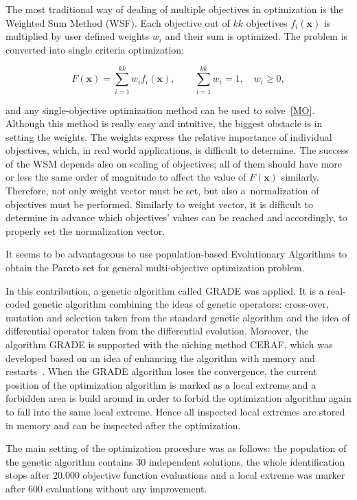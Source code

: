 \documentclass[review]{myarticle}
\newenvironment{lineq}
    {\begin{linenomath*}
    \begin{equation}
    }
    { 
    \end{equation} 
    \end{linenomath*}
    }
\renewcommand{\vec}{\mathbf}
\begin{document}
The most traditional way of dealing of multiple objectives in optimization is the Weighted Sum Method (WSF). Each objective out of $kk$ objectives $f_i(\vec{x})$ is multiplied by user defined weights $w_i$ and their sum is optimized. The problem is converted into single criteria optimization:
%
\begin{lineq}\label{MO}
    F(\vec{x}) = \sum_{i=1}^{kk} w_i f_i(\vec{x}) , \quad\quad \sum_{i=1}^{kk} w_i = 1, \quad w_i \ge 0 ,
\end{lineq}
and any single-objective optimization method can be used to solve~\eqref{MO}. Although this method is really easy and intuitive, the biggest obstacle is in setting the weights. The weights express the relative importance of individual objectives, which, in real world applications, is difficult to determine. The success of the WSM depends also on scaling of objectives; all of them should have more or less the same order of magnitude to affect the value of $F(\vec{x})$ similarly. Therefore, not only weight vector must be set, but also a~normalization of objectives must be performed. Similarly to weight vector, it is difficult to determine in advance which objectives' values can be reached and accordingly, to properly set the normalization vector.

It seems to be advantageous to use population-based Evolutionary Algorithms to obtain the Pareto set for general multi-objective optimization problem.

In this contribution, a genetic algorithm called GRADE \citep{grade,Kucerova:2007:PHD} was applied. It is a real-coded genetic algorithm combining the ideas of genetic operators: cross-over, mutation and selection taken from the
standard genetic algorithm and the idea of differential operator taken from the differential evolution.
Moreover, the algorithm GRADE is supported with the niching method
CERAF, which was developed based on an idea of enhancing the algorithm with
memory and restarts~\citep{ceraf}. When the GRADE algorithm loses the convergence, the current position of the optimization algorithm is marked as a local extreme and a forbidden area is build around in order to forbid the optimization algorithm again to fall into the same local extreme. Hence all inspected local extremes are stored in memory and can be inspected after the optimization. 

The main setting of the optimization procedure was as follows: the population of the genetic algorithm contains 30 independent solutions, the whole identification stops after 20.000 objective function evaluations and a local extreme was marker after 600 evaluations without any improvement.
\end{document}
